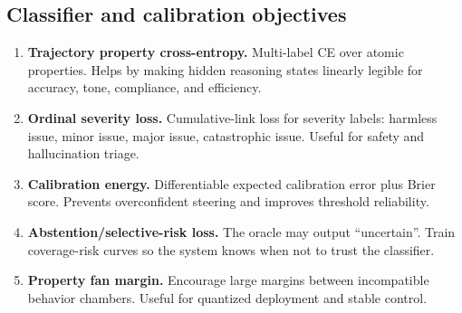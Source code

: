 \documentclass[11pt]{article}
\numberwithin{equation}{section}
\begin{document}
\subsection{Classifier and calibration objectives}
\begin{enumerate}
\item \textbf{Trajectory property cross-entropy.} Multi-label CE over atomic properties. Helps by making hidden reasoning states linearly legible for accuracy, tone, compliance, and efficiency.
\item \textbf{Ordinal severity loss.} Cumulative-link loss for severity labels: harmless issue, minor issue, major issue, catastrophic issue. Useful for safety and hallucination triage.
\item \textbf{Calibration energy.} Differentiable expected calibration error plus Brier score. Prevents overconfident steering and improves threshold reliability.
\item \textbf{Abstention/selective-risk loss.} The oracle may output ``uncertain''. Train coverage-risk curves so the system knows when not to trust the classifier.
\item \textbf{Property fan margin.} Encourage large margins between incompatible behavior chambers. Useful for quantized deployment and stable control.
\end{enumerate}
\end{document}
